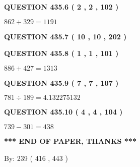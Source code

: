 \documentclass{ctexart}
\begin{document}
 
  
\vspace{0.2in}
  
{\textbf{\Large{QUESTION
435.6 
 ( 2 , 2 , 102 )
}}}
  
  
 
 

$ %
862 +  %
329=   %
1191$
 
 
  
\vspace{0.2in}
  
{\textbf{\Large{QUESTION
435.7 
 ( 10 , 10 , 202 )
}}}
  
  
  
\vspace{0.2in}
  
{\textbf{\Large{QUESTION
435.8 
 ( 1 , 1 , 101 )
}}}
  
  
 
 

$ %
886 +  %
427=   %
1313$
 
 
  
\vspace{0.2in}
  
{\textbf{\Large{QUESTION
435.9 
 ( 7 , 7 , 107 )
}}}
  
  
 
 

$ %
781 \div  %
189=   %
4.132275132$
 
 
  
\vspace{0.2in}
  
{\textbf{\Large{QUESTION
435.10 
 ( 4 , 4 , 104 )
}}}
  
  
 
 

$ %
739 -  %
301=   %
438$
 
 
   
   
 \vspace{0.2in}
 
   
   
   
   
\vspace{1.0in} 
{\textbf{\large{ *** END OF PAPER, THANKS *** }}} 
   
   
\hspace{1.0in} By: 
 239 ( 416 ,  443 )
   
   
   
   
\newpage 
\setcounter{page}{ 
   436001 } 
   
   
   
\end{document}
